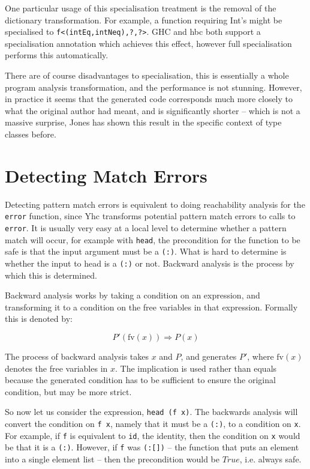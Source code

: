 \documentclass[preprint]{sigplanconf}
\newcommand{\T}[1]{\texttt{#1}}
\begin{document}
One particular usage of this specialisation treatment is the removal of the
dictionary transformation. For example, a function requiring Int's might be
specialised to \T{f<(intEq,intNeq),?,?>}. GHC and hbc both support a
specialisation annotation which achieves this effect, however full
specialisation performs this automatically.

There are of course disadvantages to specialisation, this is essentially a
whole program analysis transformation, and the performance is not stunning.
However, in practice it seems that the generated code corresponds much more
closely to what the original author had meant, and is significantly shorter --
which is not a massive surprise, Jones has shown this result in the specific
context of type classes before.

\section{Detecting Match Errors}

Detecting pattern match errors is equivalent to doing reachability analysis for
the \T{error} function, since Yhc transforms potential pattern match errors to
calls to \T{error}. It is usually very easy at a local level to determine
whether a pattern match will occur, for example with \T{head}, the precondition
for the function to be safe is that the input argument must be a \T{(:)}. What
is hard to determine is whether the input to head is a \T{(:)} or not. Backward
analysis is the process by which this is determined.

Backward analysis works by taking a condition on an expression, and
transforming it to a condition on the free variables in that expression.
Formally this is denoted by:

\[ P'(\text{fv}(x)) \Rightarrow P(x) \]

The process of backward analysis takes $x$ and $P$, and generates $P'$, where
$\text{fv}(x)$ denotes the free variables in $x$. The implication is used
rather than equals because the generated condition has to be sufficient to
ensure the original condition, but may be more strict.

So now let us consider the expression, \T{head (f x)}. The backwards analysis
will convert the condition on \T{f x}, namely that it must be a \T{(:)}, to a
condition on \T{x}. For example, if \T{f} is equivalent to \T{id}, the
identity, then the condition on \T{x} would be that it is a \T{(:)}. However,
if \T{f} was \T{(:[])} -- the function that puts an element into a single
element list -- then the precondition would be $True$, i.e. always safe.
\end{document}
